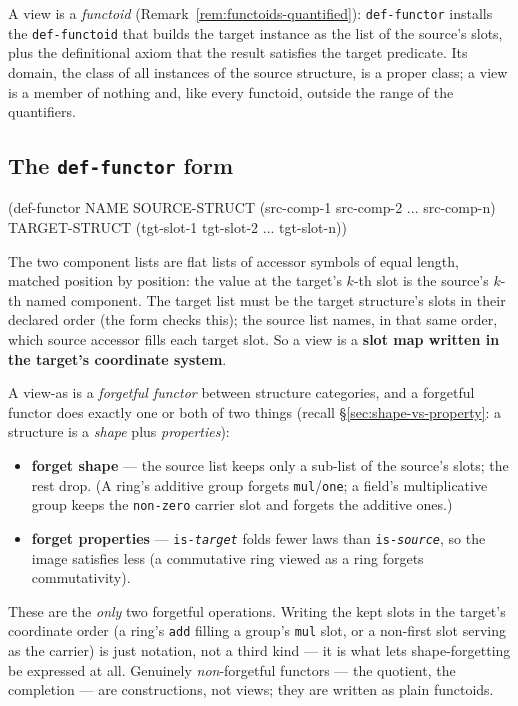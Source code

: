A view is a \emph{functoid} (Remark~\ref{rem:functoids-quantified}):
\texttt{def-functor} installs the \texttt{def-functoid} that builds the
target instance as the list of the source's slots, plus the definitional
axiom that the result satisfies the target predicate.  Its domain, the
class of all instances of the source structure, is a proper class; a
view is a member of nothing and, like every functoid, outside the range
of the quantifiers.

\subsection{The \texttt{def-functor} form}

\begin{VNBcode}
(def-functor NAME
  SOURCE-STRUCT  (src-comp-1 src-comp-2 ... src-comp-n)
  TARGET-STRUCT  (tgt-slot-1 tgt-slot-2 ... tgt-slot-n))
\end{VNBcode}

The two component lists are flat lists of accessor symbols of equal
length, matched position by position: the value at the target's $k$-th
slot is the source's $k$-th named component.  The target list must be
the target structure's slots in their declared order (the form checks
this); the source list names, in that same order, which source accessor
fills each target slot.  So a view is a \textbf{slot map written in the
target's coordinate system}.

A view-as is a \emph{forgetful functor} between structure categories, and a
forgetful functor does exactly one or both of two things (recall
\S\ref{sec:shape-vs-property}: a structure is a \emph{shape} plus
\emph{properties}):

\begin{itemize}
\item \textbf{forget shape} --- the source list keeps only a sub-list of the
  source's slots; the rest drop.  (A ring's additive group forgets
  \texttt{mul}/\texttt{one}; a field's multiplicative group keeps the
  \texttt{non-zero} carrier slot and forgets the additive ones.)
\item \textbf{forget properties} --- \texttt{is-\textit{target}} folds fewer laws than
  \texttt{is-\textit{source}}, so the image satisfies less (a commutative ring viewed
  as a ring forgets commutativity).
\end{itemize}

\noindent These are the \emph{only} two forgetful operations.  Writing the kept
slots in the target's coordinate order (a ring's \texttt{add} filling a group's
\texttt{mul} slot, or a non-first slot serving as the carrier) is just
notation, not a third kind --- it is what lets shape-forgetting be expressed at
all.  Genuinely \emph{non}-forgetful functors --- the quotient, the completion
--- are constructions, not views; they are written as plain functoids.

